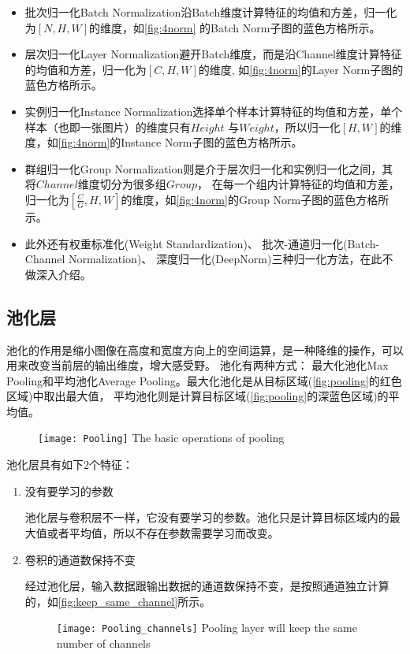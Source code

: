 \begin{itemize}
\item 批次归一化Batch Normalization沿Batch维度计算特征的均值和方差，归一化为$[N, H, W]$的维度，如\autoref{fig:4norm}
的Batch Norm子图的蓝色方格所示。

\item 层次归一化Layer Normalization避开Batch维度，而是沿Channel维度计算特征的均值和方差，归一化为$[C, H, W]$的维度,
如\autoref{fig:4norm}的Layer Norm子图的蓝色方格所示。

\item 实例归一化Instance Normalization选择单个样本计算特征的均值和方差，单个样本（也即一张图片）的维度只有$Height$
与$Weight$，所以归一化$[H, W]$的维度，如\autoref{fig:4norm}的Instance Norm子图的蓝色方格所示。

\item 群组归一化Group Normalization则是介于层次归一化和实例归一化之间，其将$Channel$维度切分为很多组$Group$，
在每一个组内计算特征的均值和方差，归一化为$[\frac{C}{G}, H, W]$的维度，如\autoref{fig:4norm}的Group Norm子图的蓝色方格所示。

\item 此外还有权重标准化(Weight Standardization\cite{Qiao2019WeightS})、 
批次-通道归一化(Batch-Channel Normalization\cite{Qiao2019RethinkingNA})、
深度归一化(DeepNorm\cite{Zare2017DeepNormADL})三种归一化方法，在此不做深入介绍。
\end{itemize}

\subsection{池化层}
池化的作用是缩小图像在高度和宽度方向上的空间运算，是一种降维的操作，可以用来改变当前层的输出维度，增大感受野。 池化有两种方式：
最大化池化Max Pooling和平均池化Average Pooling。最大化池化是从目标区域(\autoref{fig:pooling}的红色区域)中取出最大值，
平均池化则是计算目标区域(\autoref{fig:pooling}的深蓝色区域)的平均值。
\begin{figure}[!htp]
    \centering
    \texttt{[image: Pooling]}
        {The basic operations of pooling}
    \label{fig:pooling}
\end{figure}

池化层具有如下2个特征：
\begin{enumerate}
    \item {\heiti 没有要学习的参数}
    
    池化层与卷积层不一样，它没有要学习的参数。池化只是计算目标区域内的最大值或者平均值，所以不存在参数需要学习而改变。
    \item {\heiti 卷积的通道数保持不变}
    
    经过池化层，输入数据跟输出数据的通道数保持不变，是按照通道独立计算的，如\autoref{fig:keep_same_channel}所示。
    \begin{figure}[h]
        \centering
        \texttt{[image: Pooling\_channels]}
        	{Pooling layer will keep the same number of channels}
		 \label{fig:keep_same_channel}
    \end{figure}
\end{enumerate}


